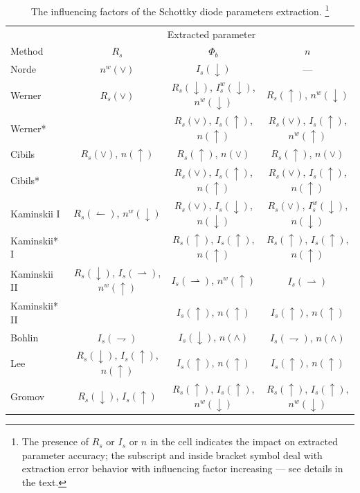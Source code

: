 \documentclass[aip,jap,reprint]{revtex4-1}
\begin{document}
\begin{table}
\caption{\label{tabIF}The influencing factors of the Schottky diode parameters extraction.
\footnote{The presence of $R_s$ or $I_s$ or $n$ in the cell indicates the impact on extracted parameter accuracy;
the subscript and inside bracket symbol deal with extraction error behavior with influencing factor increasing --- see details in the text.}
}
\begin{ruledtabular}
\begin{tabular}{lccc}
&\multicolumn{3}{c}{Extracted parameter}\\
Method &$R_s$&$\Phi_b$&$n$\\
\hline
Norde &$n^w(\vee)$&$I_s(\downarrow)$&---\\
Werner &$R_s(\vee)$&$R_s(\downarrow)$, $I_s^w(\downarrow)$, $n^w(\downarrow)$&$R_s(\uparrow)$, $n^w(\downarrow)$\\
Werner* &&$R_s(\vee)$, $I_s(\uparrow)$, $n(\uparrow)$&$R_s(\vee)$, $I_s(\uparrow)$, $n^w(\uparrow)$\\
Cibils &$R_s(\vee)$, $n(\uparrow)$&$R_s(\uparrow)$, $n(\vee)$& $R_s(\uparrow)$, $n(\vee)$\\
Cibils* &&$R_s(\vee)$, $I_s(\uparrow)$, $n(\uparrow)$& $R_s(\vee)$, $I_s(\uparrow)$, $n(\uparrow)$\\
Kaminskii I&$R_s(\leftharpoonup)$, $n^w(\downarrow)$&$R_s(\vee)$, $I_s(\downarrow)$, $n(\downarrow)$& $R_s(\vee)$, $I_s^w(\downarrow)$, $n(\downarrow)$\\
Kaminskii* I&&$R_s(\uparrow)$, $I_s(\uparrow)$, $n(\uparrow)$& $R_s(\uparrow)$, $I_s(\uparrow)$, $n(\uparrow)$\\
Kaminskii II&$R_s(\downarrow)$, $I_s(\rightharpoonup)$, $n^w(\uparrow)$&$I_s(\rightharpoonup)$, $n^w(\uparrow)$& $I_s(\rightharpoonup)$\\
Kaminskii* II&&$I_s(\uparrow)$, $n(\uparrow)$& $I_s(\uparrow)$, $n(\uparrow)$\\
Bohlin &$I_s(\rightharpoondown)$&$I_s(\downarrow)$, $n(\wedge)$& $I_s(\rightharpoondown)$, $n(\wedge)$\\
Lee &$R_s(\downarrow)$, $I_s(\uparrow)$, $n(\uparrow)$&$I_s(\uparrow)$, $n(\uparrow)$& $I_s(\uparrow)$, $n(\uparrow)$\\
Gromov &$R_s(\downarrow)$, $I_s(\uparrow)$&$R_s(\uparrow)$, $I_s(\uparrow)$, $n^w(\downarrow)$&$R_s(\uparrow)$, $I_s(\uparrow)$, $n^w(\downarrow)$\\

\end{tabular}
\end{ruledtabular}
\end{table}
\end{document}
